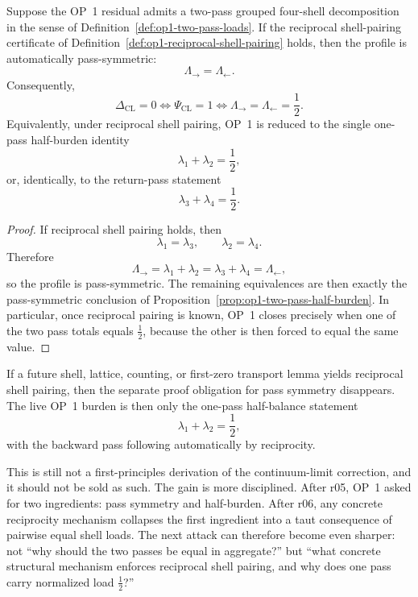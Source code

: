 \begin{proposition}
\label{prop:op1-reciprocal-pass-symmetry}
Suppose the OP~1 residual admits a two-pass grouped four-shell decomposition in the sense of Definition~\ref{def:op1-two-pass-loads}. If the reciprocal shell-pairing certificate of Definition~\ref{def:op1-reciprocal-shell-pairing} holds, then the profile is automatically pass-symmetric:
\[
  \Lambda_{\rightarrow}=\Lambda_{\leftarrow}.
\]
Consequently,
\[
  \Delta_{\mathrm{CL}}=0
  \iff
  \Psi_{\mathrm{CL}}=1
  \iff
  \Lambda_{\rightarrow}=\Lambda_{\leftarrow}=\frac12.
\]
Equivalently, under reciprocal shell pairing, OP~1 is reduced to the single one-pass half-burden identity
\[
  \lambda_1+\lambda_2=\frac12,
\]
or, identically, to the return-pass statement
\[
  \lambda_3+\lambda_4=\frac12.
\]
\end{proposition}

\begin{proof}
If reciprocal shell pairing holds, then
\[
  \lambda_1=\lambda_3,
  \qquad
  \lambda_2=\lambda_4.
\]
Therefore
\[
  \Lambda_{\rightarrow}=\lambda_1+\lambda_2
  =\lambda_3+\lambda_4=\Lambda_{\leftarrow},
\]
so the profile is pass-symmetric. The remaining equivalences are then exactly the pass-symmetric conclusion of Proposition~\ref{prop:op1-two-pass-half-burden}. In particular, once reciprocal pairing is known, OP~1 closes precisely when one of the two pass totals equals \(\tfrac12\), because the other is then forced to equal the same value.
\end{proof}

\begin{corollary}
\label{cor:op1-live-burden-after-r06}
If a future shell, lattice, counting, or first-zero transport lemma yields reciprocal shell pairing, then the separate proof obligation for pass symmetry disappears. The live OP~1 burden is then only the one-pass half-balance statement
\[
  \lambda_1+\lambda_2=\frac12,
\]
with the backward pass following automatically by reciprocity.
\end{corollary}

\begin{remark}
This is still not a first-principles derivation of the continuum-limit correction, and it should not be sold as such. The gain is more disciplined. After r05, OP~1 asked for two ingredients: pass symmetry and half-burden. After r06, any concrete reciprocity mechanism collapses the first ingredient into a taut consequence of pairwise equal shell loads. The next attack can therefore become even sharper: not ``why should the two passes be equal in aggregate?'' but ``what concrete structural mechanism enforces reciprocal shell pairing, and why does one pass carry normalized load \(\tfrac12\)?''
\end{remark}


